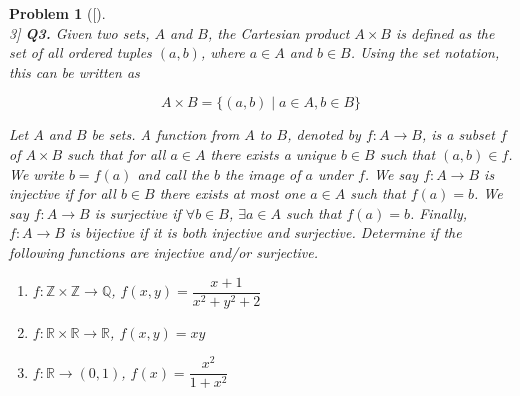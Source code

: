 \documentclass[12pt]{article}
\newtheorem{problemx}{Problem}
\newenvironment{problem}[1]{%
	\begin{problemx}[#1]\leavevmode\\[0.5em] %
	}{%
	\end{problemx}
}
\begin{document}
	
	\begin{problem}[3]
\textbf{Q3.} Given two sets, $A$ and $B$, the \textit{Cartesian product} $A \times B$ is defined as the set of all ordered tuples $(a, b)$, where $a \in A$ and $b \in B$. Using the set notation, this can be written as

$$A \times B = \{ (a, b) \mid a \in A, b \in B \}$$

Let $A$ and $B$ be sets. A \textit{function} from $A$ to $B$, denoted by $f : A \rightarrow B$, is a subset $f$ of $A \times B$ such that for all $a \in A$ there exists a unique $b \in B$ such that $(a, b) \in f$. We write $b = f(a)$ and call the $b$ the \textit{image of} $a$ under $f$. We say $f : A \rightarrow B$ is \textit{injective} if for all $b \in B$ there exists at most one $a \in A$ such that $f(a) = b$. We say $f : A \rightarrow B$ is \textit{surjective} if $\forall b \in B$, $\exists a \in A$ such that $f(a) = b$. Finally, $f : A \rightarrow B$ is \textit{bijective} if it is both injective and surjective. Determine if the following functions are injective and/or surjective.

\begin{enumerate}
	\item $f : \mathbb{Z} \times \mathbb{Z} \rightarrow \mathbb{Q}$, $f(x, y) = \dfrac{x + 1}{x^2 + y^2 + 2}$
	
	\item $f : \mathbb{R} \times \mathbb{R} \rightarrow \mathbb{R}$, $f(x, y) = xy$
	
	\item $f : \mathbb{R} \rightarrow (0, 1)$, $f(x) = \dfrac{x^2}{1 + x^2}$
\end{enumerate}
	\end{problem}
	
\end{document}
